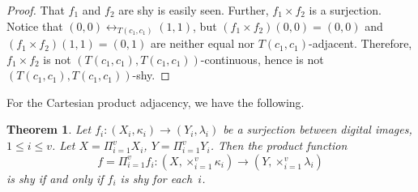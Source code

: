 \documentclass{article}
\theoremstyle{plain}
\newtheorem{thm}{Theorem}
\theoremstyle{definition}
\numberwithin{thm}{section}
\newcommand{\adj}{\leftrightarrow}
\begin{document}
\begin{proof}
That $f_1$ and $f_2$ are shy is easily seen. Further, $f_1 \times f_2$ is a surjection. Notice that
$(0,0) \adj_{T(c_1,c_1)} (1,1)$, but
$(f_1 \times f_2)(0,0)=(0,0)$ and
$(f_1 \times f_2)(1,1)=(0,1)$ are
neither equal nor $T(c_1,c_1)$-adjacent. Therefore,
$f_1 \times f_2$ is not $(T(c_1,c_1),T(c_1,c_1))$-continuous, hence is not $(T(c_1,c_1),T(c_1,c_1))$-shy.
\end{proof}

For the Cartesian product adjacency, we have the following.

\begin{thm}
\label{Cart-shy-factor}
Let $f_i: (X_i, \kappa_i) \to (Y_i, \lambda_i)$ be
a surjection between digital images,
$1 \leq i \leq v$. Let
$X=\Pi_{i=1}^v X_i$, $Y=\Pi_{i=1}^v Y_i$.
Then the product function
\[ f=\Pi_{i=1}^v f_i: (X, \times_{i=1}^v \kappa_i) \to (Y, \times_{i=1}^v \lambda_i)
\]
is shy if and only if $f_i$ is shy for each~$i$.
\end{thm}
\end{document}

